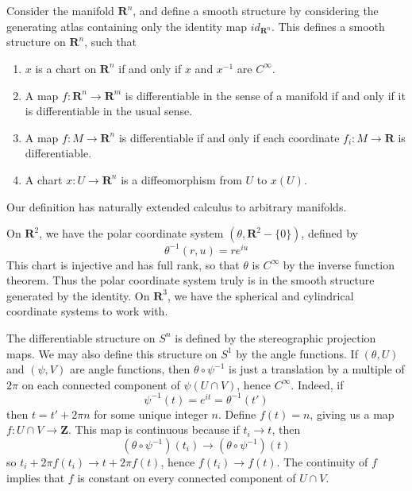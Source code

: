 \begin{example}
    Consider the manifold $\mathbf{R}^n$, and define a smooth structure by considering the generating atlas containing only the identity map $id_{\mathbf{R}^n}$. This defines a smooth structure on $\mathbf{R}^n$, such that
    \begin{enumerate}
        \item $x$ is a chart on $\mathbf{R}^n$ if and only if $x$ and $x^{-1}$ are $C^\infty$.
        \item A map $f:\mathbf{R}^n \to \mathbf{R}^m$ is differentiable in the sense of a manifold if and only if it is differentiable in the usual sense.
        \item A map $f:M \to \mathbf{R}^n$ is differentiable if and only if each coordinate $f_i:M \to \mathbf{R}$ is differentiable.
        \item A chart $x:U \to \mathbf{R}^n$ is a diffeomorphism from $U$ to $x(U)$.
    \end{enumerate}
    Our definition has naturally extended calculus to arbitrary manifolds.
\end{example}

\begin{example}
    On $\mathbf{R}^2$, we have the polar coordinate system $(\theta, \mathbf{R}^2 - \{0\})$, defined by
    \[ \theta^{-1}(r,u) = re^{iu} \]
    This chart is injective and has full rank, so that $\theta$ is $C^\infty$ by the inverse function theorem. Thus the polar coordinate system truly is in the smooth structure generated by the identity. On $\mathbf{R}^3$, we have the spherical and cylindrical coordinate systems to work with.
\end{example}

\begin{example}
    The differentiable structure on $S^n$ is defined by the stereographic projection maps. We may also define this structure on $S^1$ by the angle functions. If $(\theta,U)$ and $(\psi,V)$ are angle functions, then $\theta \circ \psi^{-1}$ is just a translation by a multiple of $2\pi$ on each connected component of $\psi(U \cap V)$, hence $C^\infty$. Indeed, if
    \[ \psi^{-1}(t) = e^{it} = \theta^{-1}(t') \]
    then $t = t' + 2 \pi n$ for some unique integer $n$. Define $f(t) = n$, giving us a map $f: U \cap V \to \mathbf{Z}$. This map is continuous because if $t_i \to t$, then
    \[ (\theta \circ \psi^{-1})(t_i) \to (\theta \circ \psi^{-1})(t) \]
    so $t_i + 2 \pi f(t_i) \to t + 2 \pi f(t)$, hence $f(t_i) \to f(t)$. The continuity of $f$ implies that $f$ is constant on every connected component of $U \cap V$.
\end{example}

